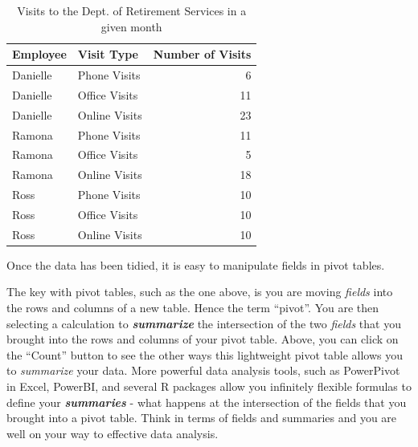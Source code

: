 \documentclass[]{book}
\newenvironment{Shaded}{\begin{snugshade}}{\end{snugshade}}
\newcommand{\DataTypeTok}[1]{\textcolor[rgb]{0.13,0.29,0.53}{#1}}
\newcommand{\KeywordTok}[1]{\textcolor[rgb]{0.13,0.29,0.53}{\textbf{#1}}}
\newcommand{\NormalTok}[1]{#1}
\newcommand{\OperatorTok}[1]{\textcolor[rgb]{0.81,0.36,0.00}{\textbf{#1}}}
\newcommand{\StringTok}[1]{\textcolor[rgb]{0.31,0.60,0.02}{#1}}
\begin{document}
\begin{table}

\caption{\label{tab:unnamed-chunk-9}Visits to the Dept. of Retirement Services in a given month}
\centering
\begin{tabular}[t]{l|l|r}
\hline
Employee & Visit Type & Number of Visits\\
\hline
Danielle & Phone Visits & 6\\
\hline
Danielle & Office Visits & 11\\
\hline
Danielle & Online Visits & 23\\
\hline
Ramona & Phone Visits & 11\\
\hline
Ramona & Office Visits & 5\\
\hline
Ramona & Online Visits & 18\\
\hline
Ross & Phone Visits & 10\\
\hline
Ross & Office Visits & 10\\
\hline
Ross & Online Visits & 10\\
\hline
\end{tabular}
\end{table}

Once the data has been tidied, it is easy to manipulate fields in pivot tables.

\begin{Shaded}
\end{Shaded}

\hypertarget{htmlwidget-59691f8895902efc3169}{}

The key with pivot tables, such as the one above, is you are moving \emph{fields} into the rows and columns of a new table. Hence the term ``pivot''. You are then selecting a calculation to \textbf{\emph{summarize}} the intersection of the two \emph{fields} that you brought into the rows and columns of your pivot table. Above, you can click on the ``Count'' button to see the other ways this lightweight pivot table allows you to \emph{summarize} your data. More powerful data analysis tools, such as PowerPivot in Excel, PowerBI, and several R packages allow you infinitely flexible formulas to define your \textbf{\emph{summaries}} - what happens at the intersection of the fields that you brought into a pivot table. Think in terms of fields and summaries and you are well on your way to effective data analysis.
\end{document}
